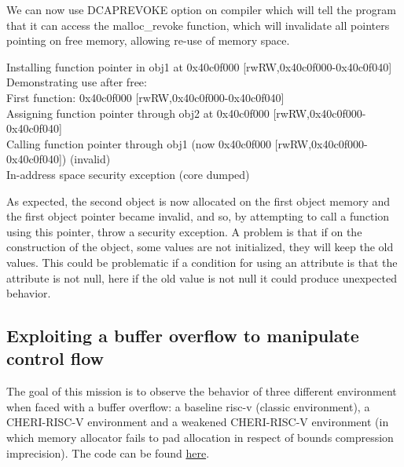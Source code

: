\documentclass[a4paper, 11pt]{article}
\begin{document}
		We can now use DCAPREVOKE option on compiler which will tell the program that it can access the malloc\_revoke function, which will invalidate all pointers pointing on free memory, allowing re-use of memory space.
		\begin{tcolorbox}[colback=gray!5!white, colframe=purple!75!black, title=Output on CHERI protected environment \& CAPREVOKE compiler option active]
			Installing function pointer in obj1 at 0x40c0f000 [rwRW,0x40c0f000-0x40c0f040]\\
			Demonstrating use after free:\\
			First function: 0x40c0f000 [rwRW,0x40c0f000-0x40c0f040]\\
			Assigning function pointer through obj2 at 0x40c0f000 [rwRW,0x40c0f000-0x40c0f040]\\
			Calling function pointer through obj1 (now 0x40c0f000  [rwRW,0x40c0f000-0x40c0f040]) (invalid)\\
			In-address space security exception (core dumped)
		\end{tcolorbox}
		As expected, the second object is now allocated on the first object memory and the first object pointer became invalid, and so, by attempting to call a function using this pointer, throw a security exception.
		A problem is that if on the construction of the object, some values are not initialized, they will keep the old values.
		This could be problematic if a condition for using an attribute is that the attribute is not null, here if the old value is not null it could produce unexpected behavior.
	

	\subsection{Exploiting a buffer overflow to manipulate control flow}
		The goal of this mission is to observe the behavior of three different environment when faced with a buffer overflow: a baseline \Gls{risc-v} (classic environment), a CHERI-RISC-V environment and a weakened CHERI-RISC-V environment (in which memory allocator fails to pad allocation in respect of bounds compression imprecision).
		The code can be found \href{https://ctsrd-cheri.github.io/cheri-exercises/missions/buffer-overflow-control-flow/index.html}{here}.
		
\end{document}
